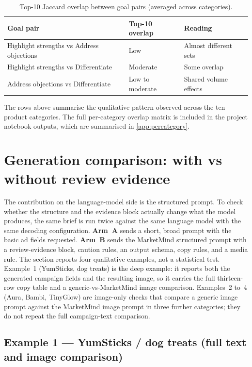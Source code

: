 \documentclass[12pt,a4paper]{report}
\begin{document}
\begin{table}[ht!]
  \centering
  \caption{Top-10 Jaccard overlap between goal pairs (averaged across categories).}
  \label{tab:jaccard}
  \begin{tabular}{@{}lll@{}}
    \toprule
    Goal pair & Top-10 overlap & Reading \\
    \midrule
    Highlight strengths vs Address objections & Low & Almost different sets \\
    Highlight strengths vs Differentiate      & Moderate & Some overlap \\
    Address objections vs Differentiate       & Low to moderate & Shared volume effects \\
    \bottomrule
  \end{tabular}
\end{table}

The rows above summarise the qualitative pattern observed across the ten product categories. The full per-category overlap matrix is included in the project notebook outputs, which are summarised in \cref{app:percategory}.

\section{Generation comparison: with vs without review evidence}
\label{sec:ablation}

The contribution on the language-model side is the structured prompt. To check whether the structure and the evidence block actually change what the model produces, the same brief is run twice against the same language model with the same decoding configuration. \textbf{Arm~A} sends a short, broad prompt with the basic ad fields requested. \textbf{Arm~B} sends the MarketMind structured prompt with a review-evidence block, caution rules, an output schema, copy rules, and a media rule. The section reports four qualitative examples, not a statistical test. Example~1 (YumSticks, dog treats) is the deep example: it reports both the generated campaign fields and the resulting image, so it carries the full thirteen-row copy table and a generic-vs-MarketMind image comparison. Examples~2 to~4 (Aura, Bambi, TinyGlow) are image-only checks that compare a generic image prompt against the MarketMind image prompt in three further categories; they do not repeat the full campaign-text comparison.

\subsection*{Example 1 --- YumSticks / dog treats (full text and image comparison)}
\end{document}
